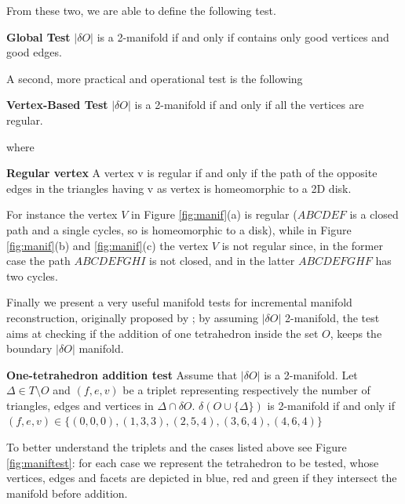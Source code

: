 From these two, we are able to define the following test.

\begin{thm}
  \textbf{Global Test}   
  $|\delta O|$ is a 2-manifold if and only if contains only good vertices and good edges.
\end{thm}



A second, more practical and operational test is the following


\begin{thm}
  \textbf{Vertex-Based Test}   
   $|\delta O|$ is a 2-manifold if and only if all the vertices are regular.
\end{thm}

where

\begin{mydef}
  \textbf{Regular vertex}   
   A vertex v is regular  if and only if the path of the opposite edges in the triangles having v as vertex is homeomorphic to a 2D disk.
\end{mydef}


For instance the vertex $V$ in Figure \ref{fig:manif}(a) is regular ($ABCDEF$ is a closed path and a single cycles, so is homeomorphic to a disk), while in Figure \ref{fig:manif}(b) and \ref{fig:manif}(c) the vertex $V$ is not regular since, in the former case the path $ABCDEFGHI$ is not closed, and in the latter $ABCDEFGHF$ has two cycles.


Finally we present a very useful manifold tests for incremental manifold reconstruction, originally proposed by \cite{litvinov_lhuillier_13}; by assuming $|\delta O|$ 2-manifold, the test aims at checking if the addition of one tetrahedron inside the set $O$, keeps the boundary $|\delta O|$ manifold.



\begin{thm}
  \textbf{One-tetrahedron addition test}   
  Assume that $|\delta O|$ is a 2-manifold. Let $\Delta \in T \setminus O$ and $(f,e,v)$ be a triplet representing respectively the number of triangles, edges and vertices in $ \Delta \cap \delta O$.
  $\delta (O \cup \{ \Delta \})$ is 2-manifold if and only if  $(f,e,v) \in  \{(0, 0, 0),\allowbreak (1, 3, 3),\allowbreak (2, 5, 4),\allowbreak (3, 6, 4),\allowbreak (4, 6, 4)\}$
\end{thm}
To better understand the triplets and the cases listed above see Figure \ref{fig:maniftest}: for each case we represent the tetrahedron to be tested, whose vertices, edges and facets are depicted in blue, red and green if they intersect the manifold before addition.

